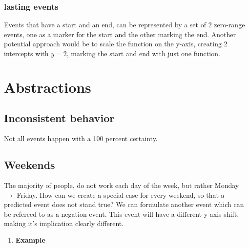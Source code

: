 \documentclass[11pt]{article}
\begin{document}
\subsubsection{lasting events}
\label{sec:orgfffd6fb}
Events that have a start and an end, can be represented by a set of 2 zero-range events, one as a marker for the start and the other marking the end. Another potential approach would be to scale the function on the y-axis, creating 2 intercepts with \(y=2\), marking the start and end with just one function.
\section{Abstractions}
\label{sec:orgb4b4a5c}
\subsection{Inconsistent behavior}
\label{sec:orga6ad15e}
Not all events happen with a 100 percent certainty.
\subsection{Weekends}
\label{sec:org5ab999d}
The majority of people, do not work each day of the week, but rather Monday \(\to\) Friday. How can we create a special case for every weekend, so that a predicted event does not stand true? We can formulate another event which can be refereed to as a negation event. This event will have a different y-axis shift, making it's implication clearly different.
\begin{enumerate}
\item \textbf{Example}
\label{sec:org6cfdcc7}
\end{enumerate}
\end{document}
